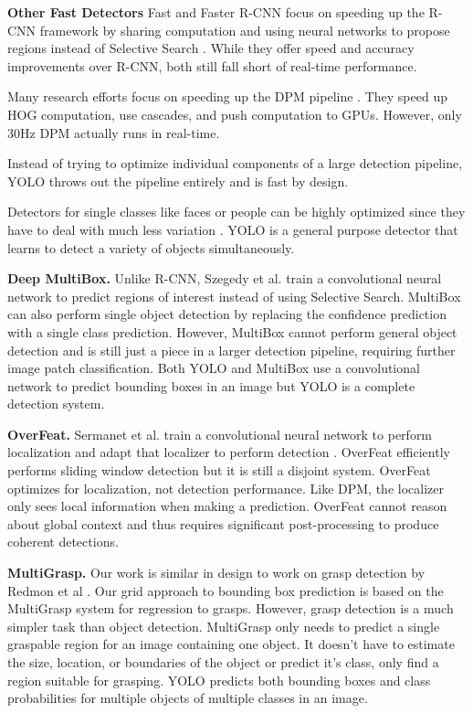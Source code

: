 \documentclass[10pt,twocolumn,letterpaper]{article}
\begin{document}
\textbf{Other Fast Detectors} Fast and Faster R-CNN focus on speeding up the R-CNN framework by sharing computation and using neural networks to propose regions instead of Selective Search \cite{DBLP:journals/corr/Girshick15} \cite{ren2015faster}. While they offer speed and accuracy improvements over R-CNN, both still fall short of real-time performance.

Many research efforts focus on speeding up the DPM pipeline \cite{sadeghi201430hz} \cite{yan2014fastest} \cite{dean2013fast}. They speed up HOG computation, use cascades, and push computation to GPUs. However, only 30Hz DPM \cite{sadeghi201430hz} actually runs in real-time.

Instead of trying to optimize individual components of a large detection pipeline, YOLO throws out the pipeline entirely and is fast by design.

Detectors for single classes like faces or people can be highly optimized since they have to deal with much less variation \cite{viola2004robust}. YOLO is a general purpose detector that learns to detect a variety of objects simultaneously.

\textbf{Deep MultiBox.} Unlike R-CNN, Szegedy et al. train a convolutional neural network to predict regions of interest \cite{erhan2014scalable} instead of using Selective Search. MultiBox can also perform single object detection by replacing the confidence prediction with a single class prediction. However, MultiBox cannot perform general object detection and is still just a piece in a larger detection pipeline, requiring further image patch classification. Both YOLO and MultiBox use a convolutional network to predict bounding boxes in an image but YOLO is a complete detection system.

\textbf{OverFeat.} Sermanet et al. train a convolutional neural network to perform localization and adapt that localizer to perform detection \cite{DBLP:journals/corr/SermanetEZMFL13}. OverFeat efficiently performs sliding window detection but it is still a disjoint system. OverFeat optimizes for localization, not detection performance. Like DPM, the localizer only sees local information when making a prediction. OverFeat cannot reason about global context and thus requires significant post-processing to produce coherent detections.

\textbf{MultiGrasp.} Our work is similar in design to work on grasp detection by Redmon et al \cite{DBLP:journals/corr/RedmonA14}. Our grid approach to bounding box prediction is based on the MultiGrasp system for regression to grasps. However, grasp detection is a much simpler task than object detection. MultiGrasp only needs to predict a single graspable region for an image containing one object. It doesn't have to estimate the size, location, or boundaries of the object or predict it's class, only find a region suitable for grasping. YOLO predicts both bounding boxes and class probabilities for multiple objects of multiple classes in an image.
\end{document}

